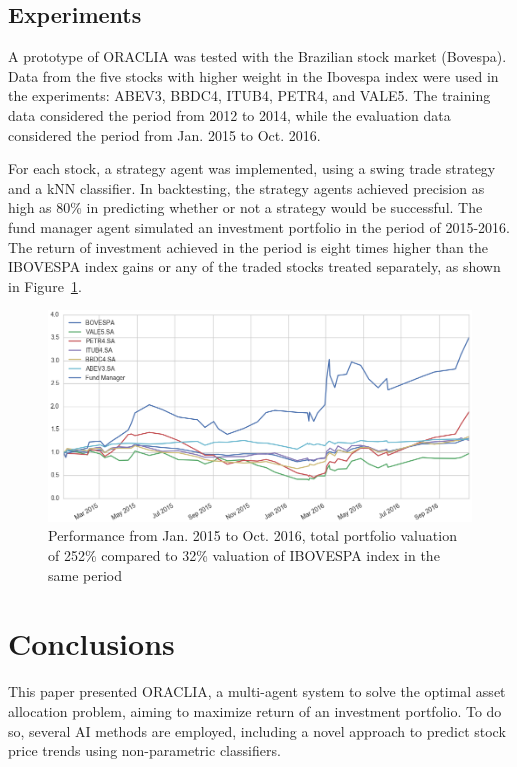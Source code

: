 \documentclass{aamas2017-extabs}
\begin{document}
\subsection{Experiments}
\label{sec-expe}

A prototype of ORACLIA was tested with the Brazilian stock market (Bovespa). Data from the five stocks with higher weight in the Ibovespa index were used in the experiments: ABEV3, BBDC4, ITUB4, PETR4, and VALE5. The training data considered the period from 2012 to 2014, while the evaluation data considered the period from Jan. 2015 to Oct. 2016. 

For each stock, a strategy agent was implemented, using a swing trade strategy and a kNN classifier. In backtesting, the strategy agents achieved precision as high as 80\% in predicting whether or not a strategy would be successful. The fund manager agent simulated an investment portfolio in the period of 2015-2016. The return of investment achieved in the period is eight times higher than the IBOVESPA index gains or any of the traded stocks treated separately, as shown in Figure~\ref{fig-performance}. 

\begin{figure}[htb]
\centering
  \includegraphics[scale=0.34]{performance-article2.png}
  \caption{Performance from Jan. 2015 to Oct. 2016, total portfolio valuation of 252\% compared to 32\% valuation of IBOVESPA index in the same period}
  \label{fig-performance}
\end{figure}

\section{Conclusions}
\label{conclu}

This paper presented ORACLIA, a multi-agent system to solve the optimal asset allocation problem, aiming to maximize return of an investment portfolio. To do so, several AI methods are employed, including a novel approach to predict stock price trends using non-parametric classifiers.
\end{document}
